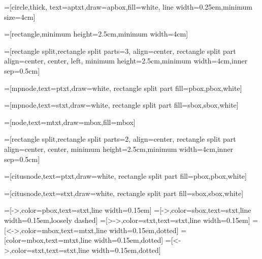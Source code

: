 




=[circle,thick,
	text=aptxt,draw=apbox,fill=white,
	line width=0.25em,minimum size=4cm]

=[rectangle,minimum height=2.5cm,minimum width=4cm]

=[rectangle split,rectangle split parts=3,
	align=center,
	rectangle split part align={center, center, left},
	minimum height=2.5cm,minimum width=4cm,inner sep=0.5cm]

=[mpnode,text=ptxt,draw=white,
  	rectangle split part fill={pbox,pbox,white}]

=[mpnode,text=stxt,draw=white,
	rectangle split part fill={sbox,sbox,white}]

=[node,text=mtxt,draw=mbox,fill=mbox]

=[rectangle split,rectangle split parts=2,
	align=center,
	rectangle split part align={center, center},
	minimum height=2.5cm,minimum width=4cm,inner sep=0.5cm]

=[citusnode,text=ptxt,draw=white,
  	rectangle split part fill={pbox,pbox,white}]

=[citusnode,text=stxt,draw=white,
	rectangle split part fill={sbox,sbox,white}]

=[->,color=pbox,text=stxt,line width=0.15em]
=[->,color=sbox,text=stxt,line width=0.15em,loosely dashed]
=[>->,color=stxt,text=stxt,line width=0.15em]
=[<->,color=mbox,text=mtxt,line width=0.15em,dotted]
=[color=mbox,text=mtxt,line width=0.15em,dotted]
=[<->,color=stxt,text=stxt,line width=0.15em,dotted]
